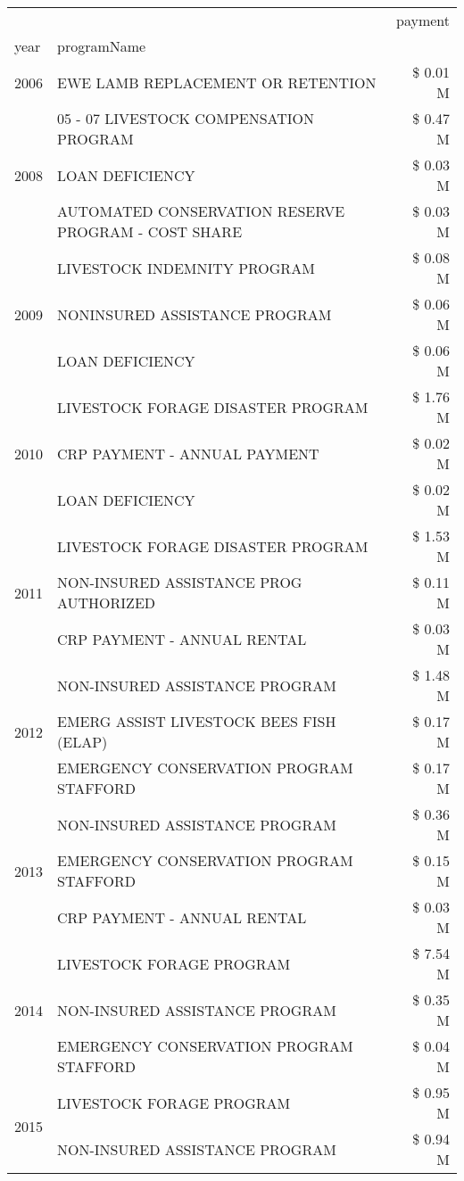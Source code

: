 \begin{tabular}{llr}
\toprule
 &  & payment \\
year & programName &  \\
\midrule
2006 & EWE LAMB REPLACEMENT OR RETENTION & \$ 0.01 M \\
\cline{1-3}
\multirow[t]{3}{*}{2008} & 05 - 07 LIVESTOCK COMPENSATION PROGRAM & \$ 0.47 M \\
 & LOAN DEFICIENCY & \$ 0.03 M \\
 & AUTOMATED CONSERVATION RESERVE PROGRAM - COST SHARE & \$ 0.03 M \\
\cline{1-3}
\multirow[t]{3}{*}{2009} & LIVESTOCK INDEMNITY PROGRAM & \$ 0.08 M \\
 & NONINSURED ASSISTANCE PROGRAM & \$ 0.06 M \\
 & LOAN DEFICIENCY & \$ 0.06 M \\
\cline{1-3}
\multirow[t]{3}{*}{2010} & LIVESTOCK FORAGE DISASTER  PROGRAM & \$ 1.76 M \\
 & CRP PAYMENT - ANNUAL PAYMENT & \$ 0.02 M \\
 & LOAN DEFICIENCY & \$ 0.02 M \\
\cline{1-3}
\multirow[t]{3}{*}{2011} & LIVESTOCK FORAGE DISASTER PROGRAM & \$ 1.53 M \\
 & NON-INSURED ASSISTANCE PROG AUTHORIZED & \$ 0.11 M \\
 & CRP PAYMENT - ANNUAL RENTAL & \$ 0.03 M \\
\cline{1-3}
\multirow[t]{3}{*}{2012} & NON-INSURED ASSISTANCE PROGRAM & \$ 1.48 M \\
 & EMERG ASSIST LIVESTOCK BEES FISH (ELAP) & \$ 0.17 M \\
 & EMERGENCY CONSERVATION PROGRAM STAFFORD & \$ 0.17 M \\
\cline{1-3}
\multirow[t]{3}{*}{2013} & NON-INSURED ASSISTANCE PROGRAM & \$ 0.36 M \\
 & EMERGENCY CONSERVATION PROGRAM STAFFORD & \$ 0.15 M \\
 & CRP PAYMENT - ANNUAL RENTAL & \$ 0.03 M \\
\cline{1-3}
\multirow[t]{3}{*}{2014} & LIVESTOCK FORAGE PROGRAM & \$ 7.54 M \\
 & NON-INSURED ASSISTANCE PROGRAM & \$ 0.35 M \\
 & EMERGENCY CONSERVATION PROGRAM STAFFORD & \$ 0.04 M \\
\cline{1-3}
\multirow[t]{3}{*}{2015} & LIVESTOCK FORAGE PROGRAM & \$ 0.95 M \\
 & NON-INSURED ASSISTANCE PROGRAM & \$ 0.94 M \\

\end{tabular}
